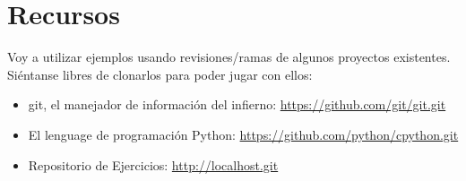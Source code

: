 
\section{Recursos}

Voy a utilizar ejemplos usando revisiones/ramas de algunos proyectos existentes. Siéntanse libres de clonarlos
para poder jugar con ellos:

\begin{itemize}

	\item git, el manejador de información del infierno: \url{https://github.com/git/git.git}
	\label{git_repo}

	\item El lenguage de programación Python: \url{https://github.com/python/cpython.git}
	\label{python_repo}
	
	\item Repositorio de Ejercicios: \url{http://localhost.git} %
	\label{exercises_repo}

\end{itemize}
